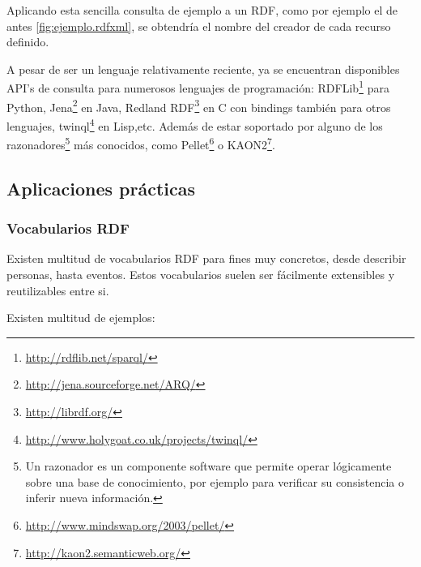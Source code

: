 Aplicando esta sencilla consulta de ejemplo a un RDF, como por ejemplo el de 
antes \ref{fig:ejemplo.rdfxml}, se obtendría el nombre del creador de cada recurso
definido.

A pesar de ser un lenguaje relativamente reciente, ya se encuentran disponibles
API's de consulta para numerosos lenguajes de programación: 
RDFLib\footnote{\url{http://rdflib.net/sparql/}} para Python, 
Jena\footnote{\url{http://jena.sourceforge.net/ARQ/}} en Java, 
Redland RDF\footnote{\url{http://librdf.org/}} en C con bindings también para 
otros lenguajes, twinql\footnote{\url{http://www.holygoat.co.uk/projects/twinql/}} 
en Lisp,etc. Además de estar soportado por alguno de los razonadores\footnote{Un 
razonador es un componente software que permite operar lógicamente sobre una base 
de conocimiento, por ejemplo para verificar su consistencia o inferir nueva
información.} más conocidos, como Pellet\footnote{\url{http://www.mindswap.org/2003/pellet/}} 
o KAON2\footnote{\url{http://kaon2.semanticweb.org/}}.

\subsection{Aplicaciones prácticas}

\subsubsection{Vocabularios RDF}

Existen multitud de vocabularios RDF para fines muy concretos, desde describir
personas, hasta eventos. Estos vocabularios suelen ser fácilmente extensibles y 
reutilizables entre si.

Existen multitud de ejemplos:

